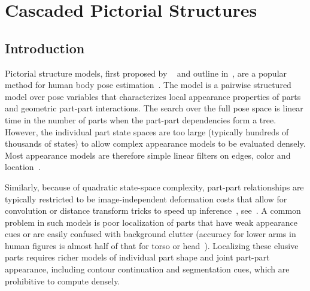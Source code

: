 \chapter{Cascaded Pictorial Structures}\label{sec:CPS}


\section{Introduction}
Pictorial structure models, first proposed by ~\cite{fischler1973ps} and outline in~, are a popular method for human body pose estimation~\cite{felz05,fergus2005sparse,devacrf,ferrari08,andriluka09}.
The model is a pairwise structured model over pose variables that characterizes 
local appearance properties of parts and geometric part-part interactions.   
The search over the full pose space is linear time in the number of parts when 
the part-part dependencies form a tree.  However,  the individual part 
state spaces are too large (typically hundreds of thousands of states) to allow 
complex appearance models to be evaluated densely.   Most appearance models are 
therefore simple linear filters on edges, color and 
location~\cite{felz05,devacrf,ferrari08,andriluka09}. 

Similarly, because of quadratic state-space complexity, part-part relationships 
are typically restricted to be image-independent deformation costs that allow 
for convolution or distance transform tricks to speed up 
inference~\cite{felz05}, see~. A common problem in such models is 
poor localization of parts that have weak appearance cues or are easily 
confused with background clutter (accuracy for lower arms in human figures is 
almost half of that for torso or head~\cite{andriluka09}).   Localizing these 
elusive parts requires richer models of individual part shape and joint 
part-part appearance, including contour continuation and segmentation cues, 
which are prohibitive to compute densely.

